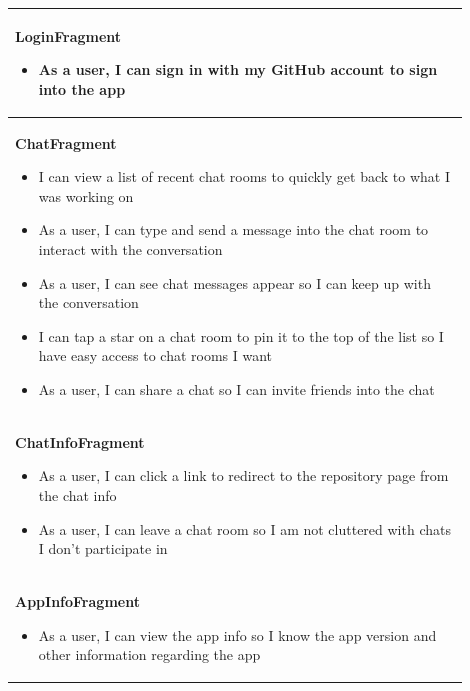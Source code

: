 \documentclass{report}
\begin{document}
\begin{center}
    \begin{tabular}{ | p{0.9\linewidth} |}
    \hline
    \textbf{LoginFragment} \begin{itemize}
                               \item As a user, I can sign in with my GitHub account to sign into the app
                           \end{itemize}                                                       \\
    \hline
    \textbf{ChatFragment} \begin{itemize}
                              \item I can view a list of recent chat rooms to quickly get back to what I was working on
                              \item As a user, I can type and send a message into the chat room to interact with the conversation
                              \item As a user, I can see chat messages appear so I can keep up with the conversation
                              \item I can tap a star on a chat room to pin it to the top of the list so I have easy access to chat rooms I want
                              \item As a user, I can share a chat so I can invite friends into the chat
                          \end{itemize}                 \\
    \hline
    \textbf{ChatInfoFragment} \begin{itemize}
                                  \item As a user, I can click a link to redirect to the repository page from the chat info
                                  \item As a user, I can leave a chat room so I am not cluttered with chats I don't participate in
                              \end{itemize}                                     \\
    \hline
    \textbf{AppInfoFragment} \begin{itemize}
                                 \item As a user, I can view the app info so I know the app version and other information regarding the app
                             \end{itemize}                     \\

\end{tabular}
\end{center}
\end{document}
